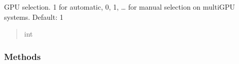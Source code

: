 \documentclass[letterpaper,10pt,english]{sphinxmanual}
\begin{document}
\begin{fulllineitems}
\begin{fulllineitems}
\begin{quote}
\begin{description}
\end{description}\end{quote}

\end{fulllineitems}


\begin{fulllineitems}
\label{\detokenize{_autosummary/nirfasterff.utils.SolverOptions:nirfasterff.utils.SolverOptions.GPU}}
\pysigstartsignatures
\pysigline
{}
\pysigstopsignatures
\sphinxAtStartPar
GPU selection. \sphinxhyphen{}1 for automatic, 0, 1, … for manual selection on multi\sphinxhyphen{}GPU systems. Default: \sphinxhyphen{}1
\begin{quote}\begin{description}
\sphinxAtStartPar
int

\end{description}\end{quote}

\end{fulllineitems}


\begin{fulllineitems}
\label{\detokenize{_autosummary/nirfasterff.utils.SolverOptions:nirfasterff.utils.SolverOptions.__init__}}
\pysigstartsignatures
\pysiglinewithargsret
{}
{\sphinxparamcomma {}\sphinxparamcomma {}\sphinxparamcomma {}\sphinxparamcomma {}}
{}
\pysigstopsignatures
\end{fulllineitems}

\subsubsection*{Methods}



\end{fulllineitems}
\end{document}
